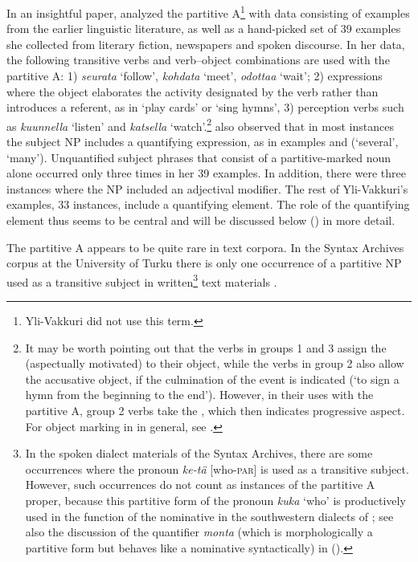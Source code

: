 \documentclass[output=paper]{LSP/langsci}
\begin{document}
In an insightful paper, \citet{Yli-Vakkuri1979Partitiivisubjektin} analyzed the partitive A\footnote{Yli-Vakkuri did not use this term.} with data consisting of examples from the earlier linguistic literature, as well as a hand-picked set of 39 examples she collected from literary fiction, newspapers and spoken discourse. In her data, the following transitive verbs and verb–object combinations are used with the partitive A: 1) \textit{seurata} ‘follow’, \textit{kohdata} ‘meet’, \textit{odottaa} ‘wait’; 2) expressions where the object elaborates the activity designated by the verb rather than introduces a referent, as in ‘play cards’ or ‘sing hymns’, 3) perception verbs such as \textit{kuunnella} ‘listen’ and \textit{katsella} ‘watch’.\footnote{It may be worth pointing out that the verbs in groups 1 and 3 assign the (aspectually motivated)  to their object, while the verbs in group 2 also allow the accusative object, if the culmination of the event is indicated (‘to sign a hymn from the beginning to the end’). However, in their uses with the partitive A, group 2 verbs take the , which then indicates progressive aspect. For object marking in  in general, see .} \citeauthor{Yli-Vakkuri1979Partitiivisubjektin} also observed that in most instances the subject NP includes a quantifying expression, as in examples  and  (‘several’, ‘many’). Unquantified subject phrases that consist of a partitive-marked noun alone occurred only three times in her 39 examples. In addition, there were three instances where the NP included an adjectival modifier. The rest of Yli-Vakkuri’s examples, 33 instances, include a quantifying element. The role of the quantifying element thus seems to be central and will be discussed below () in more detail.

The partitive A appears to be quite rare in text corpora. In the Syntax Archives corpus at the University of Turku there is only one occurrence of a partitive NP used as a transitive subject in written\footnote{In the spoken dialect materials of the Syntax Archives, there are some occurrences where the pronoun \textit{ke-tä} [who-\textsc{par}] is used as a transitive subject. However, such occurrences do not count as instances of the partitive A proper, because this partitive form of the pronoun \textit{kuka} ‘who’ is productively used in the function of the nominative in the southwestern dialects of ; see also the discussion of the quantifier \textit{monta} (which is morphologically a partitive form but behaves like a nominative syntactically) in ().} text materials .
\end{document}
